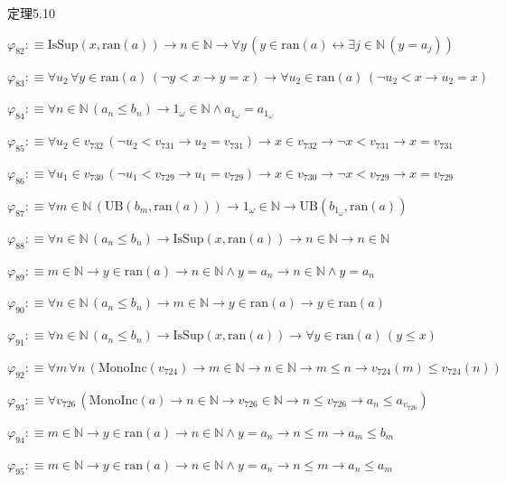 \begin{fullproof}{定理5.10}
\begin{abbrevlist}
\item $\varphi_{82} :\equiv \mathrm{IsSup}(x,\mathrm{ran}(a)) \to n \in \mathbb{N} \to \forall y\,(y \in \mathrm{ran}(a) \leftrightarrow \exists j \in \mathbb{N}\,(y = a_{j}))$
\item $\varphi_{83} :\equiv \forall u_{2}\,\forall y \in \mathrm{ran}(a)\,(\neg y < x \to y = x) \to \forall u_{2} \in \mathrm{ran}(a)\,(\neg u_{2} < x \to u_{2} = x)$
\item $\varphi_{84} :\equiv \forall n \in \mathbb{N}\,(a_{n} \leq b_{n}) \to 1_{\omega} \in \mathbb{N} \land a_{1_{\omega}} = a_{1_{\omega}}$
\item $\varphi_{85} :\equiv \forall u_{2} \in v_{732}\,(\neg u_{2} < v_{731} \to u_{2} = v_{731}) \to x \in v_{732} \to \neg x < v_{731} \to x = v_{731}$
\item $\varphi_{86} :\equiv \forall u_{1} \in v_{730}\,(\neg u_{1} < v_{729} \to u_{1} = v_{729}) \to x \in v_{730} \to \neg x < v_{729} \to x = v_{729}$
\item $\varphi_{87} :\equiv \forall m \in \mathbb{N}\,(\mathrm{UB}(b_{m},\mathrm{ran}(a))) \to 1_{\omega} \in \mathbb{N} \to \mathrm{UB}(b_{1_{\omega}},\mathrm{ran}(a))$
\item $\varphi_{88} :\equiv \forall n \in \mathbb{N}\,(a_{n} \leq b_{n}) \to \mathrm{IsSup}(x,\mathrm{ran}(a)) \to n \in \mathbb{N} \to n \in \mathbb{N}$
\item $\varphi_{89} :\equiv m \in \mathbb{N} \to y \in \mathrm{ran}(a) \to n \in \mathbb{N} \land y = a_{n} \to n \in \mathbb{N} \land y = a_{n}$
\item $\varphi_{90} :\equiv \forall n \in \mathbb{N}\,(a_{n} \leq b_{n}) \to m \in \mathbb{N} \to y \in \mathrm{ran}(a) \to y \in \mathrm{ran}(a)$
\item $\varphi_{91} :\equiv \forall n \in \mathbb{N}\,(a_{n} \leq b_{n}) \to \mathrm{IsSup}(x,\mathrm{ran}(a)) \to \forall y \in \mathrm{ran}(a)\,(y \leq x)$
\item $\varphi_{92} :\equiv \forall m\,\forall n\,(\mathrm{MonoInc}(v_{724}) \to m \in \mathbb{N} \to n \in \mathbb{N} \to m \leq n \to v_{724}(m) \leq v_{724}(n))$
\item $\varphi_{93} :\equiv \forall v_{726}\,(\mathrm{MonoInc}(a) \to n \in \mathbb{N} \to v_{726} \in \mathbb{N} \to n \leq v_{726} \to a_{n} \leq a_{v_{726}})$
\item $\varphi_{94} :\equiv m \in \mathbb{N} \to y \in \mathrm{ran}(a) \to n \in \mathbb{N} \land y = a_{n} \to n \leq m \to a_{m} \leq b_{m}$
\item $\varphi_{95} :\equiv m \in \mathbb{N} \to y \in \mathrm{ran}(a) \to n \in \mathbb{N} \land y = a_{n} \to n \leq m \to a_{n} \leq a_{m}$

\end{abbrevlist}
\end{fullproof}
